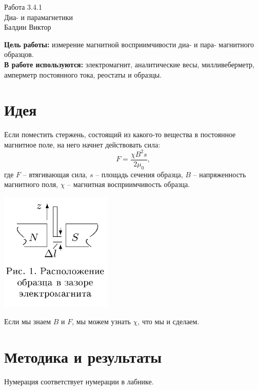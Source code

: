 \documentclass[a4paper,12pt]{article}
\begin{document}
\begin{center}
  \LARGE{Работа 3.4.1}\\[0.2cm]
  \LARGE{Диа- и парамагнетики}\\[0.2cm]
  \large{Балдин Виктор}\\[0.2cm]
\end{center}

\textbf{Цель работы:} измерение магнитной восприимчивости диа- и пара- магнитного образцов.\\
\textbf{В работе используются:} электромагнит, аналитические весы, милливеберметр, амперметр постоянного тока, реостаты и образцы.\\
\section*{Идея}

Если поместить стержень, состоящий из какого-то вещества в постоянное магнитное поле, на него начнет действовать сила:
$$F = \frac{\chi B^2 s}{2\mu_0},$$
где $F$ -- втягивающая сила, $s$ -- площадь сечения образца, $B$ -- напряженность магнитного поля, $\chi$ -- магнитная восприимчивость образца.

\begin{center}
\includegraphics[width=0.40\textwidth]{1.png}
\end{center}

Если мы знаем $B$ и $F$, мы можем узнать $\chi$, что мы и сделаем.

\newpage
\section*{Методика и результаты}
Нумерация соответствует нумерации в лабнике.
\end{document}
